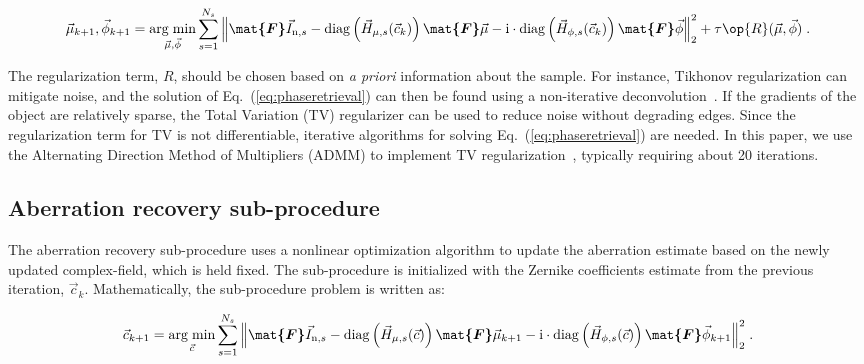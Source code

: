 \begin{equation}
\label{eq:phaseretrieval}
\vec{\mu}_{k+1},\vec{\phi}_{k+1} = \underset{\vec{\mu},\vec{\phi}}{\mathrm{arg\; min}} \sum_{s = 1}^{N_{s}} \Big\|\boldsymbol{\mat{F}}\vec{I}_{\mathrm{n},s} - \mathrm{diag}\left(\vec{H}_{\mu,s}(\vec{c}_{k})\right)\boldsymbol{\mat{F}}\vec{\mu} -\mathrm{i}\cdot\mathrm{diag}\left(\vec{H}_{\phi,s}(\vec{c}_{k})\right)\boldsymbol{\mat{F}}\vec{\phi}\Big\|_{2}^{2} + \tau \op{R}(\vec{\mu},\vec{\phi})\; .
\end{equation}

\noindent The regularization term, $R$, should be chosen based on \textit{a priori} information about the sample. For instance, Tikhonov regularization can mitigate noise, and the solution of Eq.~(\ref{eq:phaseretrieval}) can then be found using a non-iterative deconvolution~\cite{PhillipsChen17cDPC}. If the gradients of the object are relatively sparse, the Total Variation (TV) regularizer can be used to reduce noise without degrading edges. Since the regularization term for TV is not differentiable, iterative algorithms for solving Eq.~(\ref{eq:phaseretrieval}) are needed. In this paper, we use the Alternating Direction Method of Multipliers (ADMM) to implement TV regularization~\cite{boyd2011distributed}, typically requiring about 20 iterations.

\subsection{Aberration recovery sub-procedure}\label{sec:abber}
The aberration recovery sub-procedure uses a nonlinear optimization algorithm to update the aberration estimate based on the newly updated complex-field, which is held fixed. The sub-procedure is initialized with the Zernike coefficients estimate from the previous iteration, $\vec{c}_{k}$. Mathematically, the sub-procedure problem is written as:

\begin{equation}
\label{eq:pupilrecovery}
\vec{c}_{k+1} = \underset{\vec{c}}{\mathrm{arg\; min}} \sum_{s = 1}^{N_{s}} \Big\|\boldsymbol{\mat{F}}\vec{I}_{\mathrm{n},s} - \mathrm{diag}\left(\vec{H}_{\mu,s}(\vec{c})\right)\boldsymbol{\mat{F}}\vec{\mu}_{k+1} -\mathrm{i}\cdot\mathrm{diag}\left(\vec{H}_{\phi,s}(\vec{c})\right)\boldsymbol{\mat{F}}\vec{\phi}_{k+1}\Big\|_{2}^{2}\; .
\end{equation}

